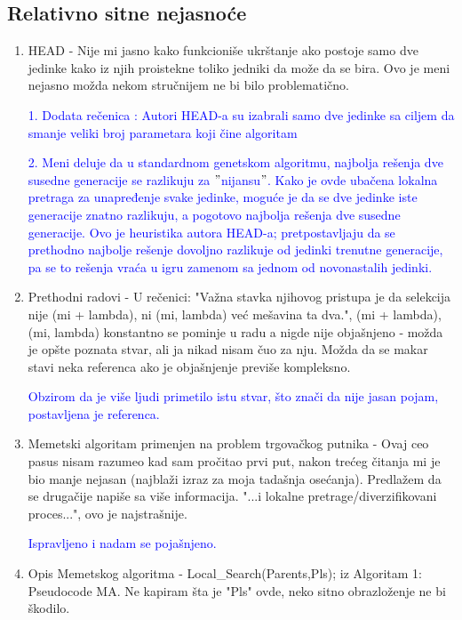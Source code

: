 \documentclass[a4paper]{report}
\newcommand{\odgovor}[1]{\textcolor{blue}{#1}}
\begin{document}
\subsection{Relativno sitne nejasnoće}
\begin{enumerate}
\item HEAD - Nije mi jasno kako funkcioniše ukrštanje ako postoje samo dve jedinke kako iz njih proistekne toliko jedniki da može da se bira. Ovo je meni nejasno možda nekom stručnijem ne bi bilo problematično.
  
  \odgovor{1. Dodata rečenica : Autori HEAD-a su izabrali samo dve jedinke sa ciljem da smanje veliki broj parametara koji čine algoritam}
  
  \odgovor{2. Meni deluje da u standardnom genetskom algoritmu, najbolja rešenja dve susedne generacije se razlikuju za $"$nijansu$"$. Kako je ovde ubačena lokalna pretraga za unapređenje svake jedinke, moguće je da se dve jedinke iste generacije znatno razlikuju, a pogotovo najbolja rešenja dve susedne generacije. Ovo je heuristika autora HEAD-a; pretpostavljaju da se prethodno najbolje rešenje dovoljno razlikuje od jedinki trenutne generacije, pa se to rešenja vraća u igru zamenom sa jednom od novonastalih jedinki.}  
  
  \item Prethodni radovi - U rečenici: "Važna stavka njihovog pristupa je da selekcija nije (mi + lambda), ni (mi, lambda) već mešavina ta dva.", (mi + lambda), (mi, lambda) konstantno se pominje u radu a nigde nije objašnjeno - možda je opšte poznata stvar, ali ja nikad nisam čuo za nju. Možda da se makar stavi neka referenca ako je objašnjenje previše kompleksno. 
  
  \odgovor{ Obzirom da je više ljudi primetilo istu stvar, što znači da nije jasan pojam, postavljena je referenca. }
  
  \item Memetski algoritam primenjen na problem trgovačkog putnika - Ovaj ceo pasus nisam razumeo kad sam pročitao prvi put, nakon trećeg čitanja mi je bio manje nejasan (najblaži izraz za moja tadašnja osećanja). Predlažem da se drugačije napiše sa više informacija. "...i lokalne pretrage/diverzifikovani proces...", ovo je najstrašnije. 
  
   \odgovor{ Ispravljeno i nadam se pojašnjeno. }
   
   \item Opis Memetskog algoritma - Local\_Search(Parents,Pls); iz Algoritam 1: Pseudocode MA. Ne kapiram šta je "Pls" ovde, neko sitno obrazloženje ne bi škodilo. 
   

\end{enumerate}
\end{document}
